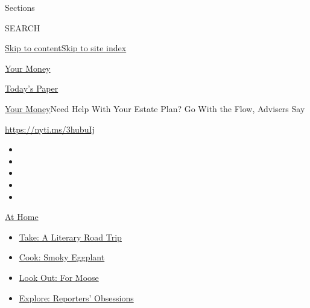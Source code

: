 Sections

SEARCH

\protect\hyperlink{site-content}{Skip to
content}\protect\hyperlink{site-index}{Skip to site index}

\href{https://www.nytimes3xbfgragh.onion/section/your-money}{Your Money}

\href{https://myaccount.nytimes3xbfgragh.onion/auth/login?response_type=cookie\&client_id=vi}{}

\href{https://www.nytimes3xbfgragh.onion/section/todayspaper}{Today's
Paper}

\href{/section/your-money}{Your Money}\textbar{}Need Help With Your
Estate Plan? Go With the Flow, Advisers Say

\href{https://nyti.ms/3hubuIj}{https://nyti.ms/3hubuIj}

\begin{itemize}
\item
\item
\item
\item
\item
\end{itemize}

\href{https://www.nytimes3xbfgragh.onion/spotlight/at-home?action=click\&pgtype=Article\&state=default\&region=TOP_BANNER\&context=at_home_menu}{At
Home}

\begin{itemize}
\tightlist
\item
  \href{https://www.nytimes3xbfgragh.onion/2020/07/28/books/time-for-a-literary-road-trip.html?action=click\&pgtype=Article\&state=default\&region=TOP_BANNER\&context=at_home_menu}{Take:
  A Literary Road Trip}
\item
  \href{https://www.nytimes3xbfgragh.onion/2020/07/29/magazine/bored-with-your-home-cooking-some-smoky-eggplant-will-fix-that.html?action=click\&pgtype=Article\&state=default\&region=TOP_BANNER\&context=at_home_menu}{Cook:
  Smoky Eggplant}
\item
  \href{https://www.nytimes3xbfgragh.onion/2020/07/27/travel/moose-michigan-isle-royale.html?action=click\&pgtype=Article\&state=default\&region=TOP_BANNER\&context=at_home_menu}{Look
  Out: For Moose}
\item
  \href{https://www.nytimes3xbfgragh.onion/interactive/2020/at-home/even-more-reporters-editors-diaries-lists-recommendations.html?action=click\&pgtype=Article\&state=default\&region=TOP_BANNER\&context=at_home_menu}{Explore:
  Reporters' Obsessions}
\end{itemize}

